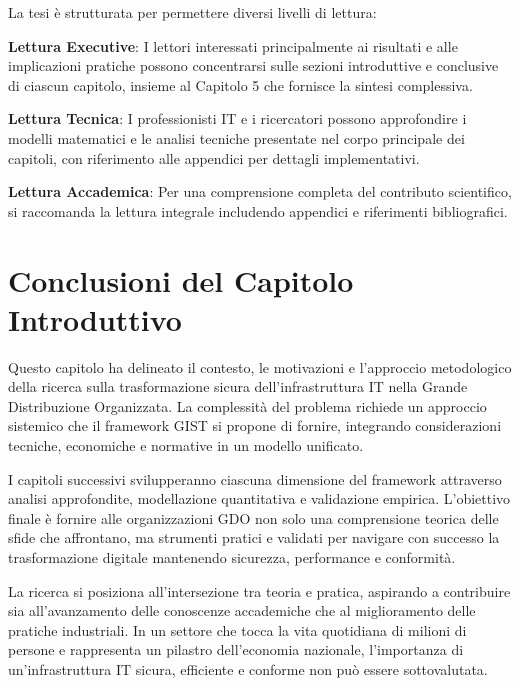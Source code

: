 La tesi è strutturata per permettere diversi livelli di lettura:

\textbf{Lettura Executive}: I lettori interessati principalmente ai risultati e alle implicazioni pratiche possono concentrarsi sulle sezioni introduttive e conclusive di ciascun capitolo, insieme al Capitolo 5 che fornisce la sintesi complessiva.

\textbf{Lettura Tecnica}: I professionisti IT e i ricercatori possono approfondire i modelli matematici e le analisi tecniche presentate nel corpo principale dei capitoli, con riferimento alle appendici per dettagli implementativi.

\textbf{Lettura Accademica}: Per una comprensione completa del contributo scientifico, si raccomanda la lettura integrale includendo appendici e riferimenti bibliografici.

\section{Conclusioni del Capitolo Introduttivo}

Questo capitolo ha delineato il contesto, le motivazioni e l'approccio metodologico della ricerca sulla trasformazione sicura dell'infrastruttura IT nella Grande Distribuzione Organizzata. La complessità del problema richiede un approccio sistemico che il framework GIST si propone di fornire, integrando considerazioni tecniche, economiche e normative in un modello unificato.

I capitoli successivi svilupperanno ciascuna dimensione del framework attraverso analisi approfondite, modellazione quantitativa e validazione empirica. L'obiettivo finale è fornire alle organizzazioni GDO non solo una comprensione teorica delle sfide che affrontano, ma strumenti pratici e validati per navigare con successo la trasformazione digitale mantenendo sicurezza, performance e conformità.

La ricerca si posiziona all'intersezione tra teoria e pratica, aspirando a contribuire sia all'avanzamento delle conoscenze accademiche che al miglioramento delle pratiche industriali. In un settore che tocca la vita quotidiana di milioni di persone e rappresenta un pilastro dell'economia nazionale, l'importanza di un'infrastruttura IT sicura, efficiente e conforme non può essere sottovalutata.


